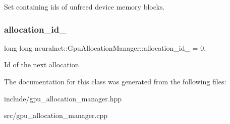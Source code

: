 Set containing ids of unfreed device memory blocks. \mbox{\label{classneuralnet_1_1GpuAllocationManager_a5af99716544aa62af9d223f134178324}} 
\subsubsection{\texorpdfstring{allocation\+\_\+id\+\_\+}{allocation\_id\_}}
{\footnotesize\ttfamily long long neuralnet\+::\+Gpu\+Allocation\+Manager\+::allocation\+\_\+id\+\_\+ = 0\hspace{0.3cm}{\ttfamily [static]}, {\ttfamily [protected]}}

Id of the next allocation. 

The documentation for this class was generated from the following files\+:\begin{DoxyCompactItemize}
\item 
include/gpu\+\_\+allocation\+\_\+manager.\+hpp\item 
src/gpu\+\_\+allocation\+\_\+manager.\+cpp\end{DoxyCompactItemize}
